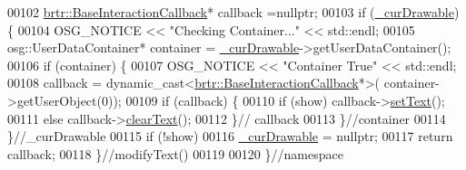 \begin{DoxyCode}
00102         \hyperlink{classbrtr_1_1_base_interaction_callback}{brtr::BaseInteractionCallback}* callback =\textcolor{keyword}{nullptr};
00103         \textcolor{keywordflow}{if} (\hyperlink{classbrtr_1_1_key_handler_a4b0e380186a8172af6cf7c10dcff675a}{\_curDrawable}) \{
00104             OSG\_NOTICE << \textcolor{stringliteral}{"Checking Container..."} << std::endl;
00105             osg::UserDataContainer* container = \hyperlink{classbrtr_1_1_key_handler_a4b0e380186a8172af6cf7c10dcff675a}{\_curDrawable}->getUserDataContainer();
00106             \textcolor{keywordflow}{if} (container) \{
00107                 OSG\_NOTICE << \textcolor{stringliteral}{"Container True"} << std::endl;
00108                 callback = \textcolor{keyword}{dynamic\_cast<}\hyperlink{classbrtr_1_1_base_interaction_callback}{brtr::BaseInteractionCallback}*\textcolor{keyword}{>}(
      container->getUserObject(0));
00109                 \textcolor{keywordflow}{if} (callback) \{
00110                     \textcolor{keywordflow}{if} (show) callback->\hyperlink{classbrtr_1_1_base_interaction_callback_a0fe57e329f044e21d49041c861435ad8}{setText}();
00111                     \textcolor{keywordflow}{else} callback->\hyperlink{classbrtr_1_1_base_interaction_callback_ad74fe9ac5d86c7f23d18614d5abb1003}{clearText}();
00112                 \}\textcolor{comment}{// callback}
00113             \}\textcolor{comment}{//container}
00114         \}\textcolor{comment}{//\_curDrawable}
00115         \textcolor{keywordflow}{if} (!show)
00116             \hyperlink{classbrtr_1_1_key_handler_a4b0e380186a8172af6cf7c10dcff675a}{\_curDrawable} = \textcolor{keyword}{nullptr};
00117         \textcolor{keywordflow}{return} callback;
00118     \}\textcolor{comment}{//modifyText()}
00119 
00120 \}\textcolor{comment}{//namespace}
\end{DoxyCode}
